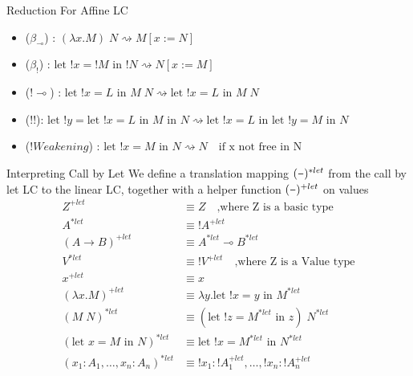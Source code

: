 \documentclass[10pt]{beamer}
\newcommand{\lam}[2]{\lambda #1 . #2}
\newcommand{\llet}[3]{\text{let }  ! #1 = #2 \text{ in } #3}
\newcommand{\plet}[3]{\text{let }   #1 = #2 \text{ in } #3}
\newcommand{\app}[2]{#1 \; #2}
\newcommand{\subst}[2]{[#1 := #2]}
\newcommand{\minus}{\scalebox{0.75}[1.0]{$-$}}
\begin{document}
\begin{frame}{Reduction For Affine LC}
  \begin{itemize}
    \item ($\beta_{\multimap}$) : $\app{(\lam{x}{M})}{N} \rightsquigarrow M \subst{x}{N}$
    \item ($\beta_{!}$) : $\llet{x}{! M}{! N} \rightsquigarrow N \subst{x}{M}$
    \item ($! \multimap$) : $\app{\llet{x}{L}{M}}{N}  \rightsquigarrow \llet{x}{L}{\app{M}{N}}$
    \item ($! !$): $\llet{y}{\llet{x}{L}{M}}{N} \rightsquigarrow \llet{x}{L}{\llet{y}{M}{N}}$
    \item ($! Weakening$) : $\llet{x}{M}{N} \rightsquigarrow N \quad \text{if x not free in N}$
  \end{itemize}
\end{frame}

\begin{frame}[fragile]{Interpreting Call by Let}
  We define a translation mapping $(\minus)^{*let}$ from the call by let LC to the linear LC, together with a helper function $(\minus)^{+let}$ on values \\
  \begin{align*}
    Z^{+let}                             & \equiv Z \quad \text{,where Z is a basic type}           \\
    A^{*let}                             & \equiv ! A^{+let}                                        \\
    (A \rightarrow B)^{+let}             & \equiv A^{*let} \multimap B^{*let}                       \\
    V^{*let}                             & \equiv ! V^{+let} \quad \text{,where Z is a Value type}  \\
    x^{+let}                             & \equiv x                                                 \\
    (\lam{x}{M})^{+let}                  & \equiv \lam{y}{\llet{x}{y}{M^{*let}}}                    \\
    (\app{M}{N})^{*let}                  & \equiv \app{(\llet{z}{M^{*let}}{z})}{N^{*let}}           \\
    (\plet{x}{M}{N})^{*let}              & \equiv \llet{x}{M^{*let}}{N^{*let}}                      \\
    (x_1 : A_1, \dots, x_n : A_n)^{*let} & \equiv ! x_1 : ! A_1^{+let}, \dots, ! x_n : ! A_n^{+let} \\
  \end{align*}
\end{frame}
\end{document}

